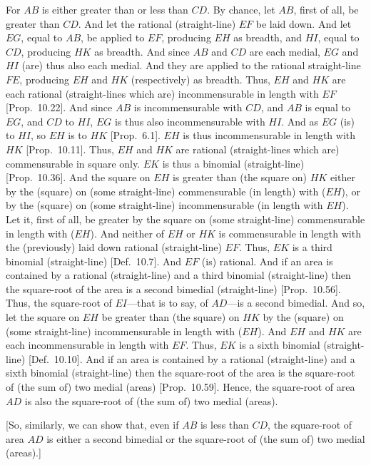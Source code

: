 \begin{Parallel}{}{}
{For $AB$ is either greater than or less than $CD$. By chance, let $AB$,
first of all,  be greater than $CD$. And let the rational (straight-line)
$EF$ be laid down. And let $EG$, equal to $AB$, be applied
to $EF$, producing $EH$ as breadth, and $HI$, equal to $CD$, producing
$HK$ as breadth. And since $AB$ and $CD$ are each medial,
$EG$ and $HI$ (are) thus also each medial. And they are applied to
the rational straight-line $FE$, producing $EH$ and $HK$ (respectively) as breadth. Thus, $EH$ and $HK$ are  each rational (straight-lines which are) incommensurable in length with $EF$ [Prop.~10.22]. And since $AB$ is incommensurable
with $CD$, and $AB$ is equal to $EG$, and $CD$ to $HI$, $EG$
is thus also incommensurable with $HI$. And as $EG$ (is) to $HI$,
so $EH$ is to $HK$ [Prop.~6.1].  $EH$ is thus
incommensurable in length with $HK$ [Prop.~10.11]. Thus, $EH$ and $HK$ are rational
(straight-lines which are) commensurable in square only. $EK$
is thus a binomial (straight-line) [Prop.~10.36]. 
And the square on $EH$ is  greater than (the square on) $HK$
either by the (square) on (some straight-line) commensurable (in length) with ($EH$), or
by the (square) on (some straight-line) incommensurable (in length
with $EH$). Let it, first of all, be greater by the square on (some
straight-line) commensurable in length with ($EH$). And neither of
$EH$ or $HK$ is commensurable in length with the (previously)
laid down rational (straight-line) $EF$.  Thus, $EK$ is a third
binomial (straight-line) [Def.~10.7]. And $EF$
(is) rational. And if an area is contained by a rational (straight-line) and
a third binomial (straight-line)  then the square-root of the area
is a second bimedial  (straight-line) [Prop.~10.56]. Thus,
the square-root of $EI$---that is to say, of $AD$---is a second bimedial.
And so, let the square on $EH$ be greater than (the square) on $HK$
by the (square)  on (some straight-line) incommensurable in length
with ($EH$).  And $EH$ and $HK$
are each incommensurable
in length with $EF$. Thus, $EK$ is a sixth binomial (straight-line)
[Def.~10.10]. And if an area
is contained by
a rational (straight-line) and a sixth binomial (straight-line)  then the square-root of the area is the square-root of (the sum of) two medial (areas) 
[Prop.~10.59]. Hence, the
square-root of area $AD$ is also the square-root of (the sum of)
two medial (areas).

\epsfysize=2in 
\centerline{}

\mbox{[}So, similarly, we can show that, even if $AB$ is less than $CD$, the
square-root of area $AD$ is either a second bimedial or the square-root
of (the sum of) two medial (areas).]

}
\end{Parallel}
